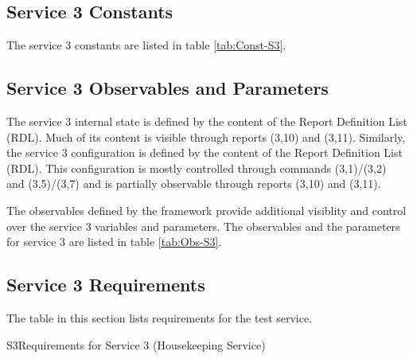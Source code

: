 \documentclass{pnp_article}
\begin{document}
\newpage
\subsection{Service 3 Constants}\label{sec:serv3Const}
The service 3 constants are listed in table \ref{tab:Const-S3}.




\subsection{Service 3 Observables and Parameters}\label{sec:serv3Obs}
The service 3 internal state is defined by the content of the Report Definition List (RDL). Much of its content is visible through reports (3,10) and (3,11). Similarly, the service 3 configuration is defined by the content of the Report Definition List (RDL). This configuration is mostly controlled through commands (3,1)/(3,2) and (3,5)/(3,7) and is partially observable through reports (3,10) and (3,11). 

The observables defined by the framework provide additional visiblity and control over the service 3 variables and parameters. The observables and the parameters for service 3 are listed in table \ref{tab:Obs-S3}.



\subsection{Service 3 Requirements}
The table in this section lists requirements for the test service.

\begin{crReq}{S3}{Requirements for Service 3 (Housekeeping Service)}
\end{crReq}
\end{document}
